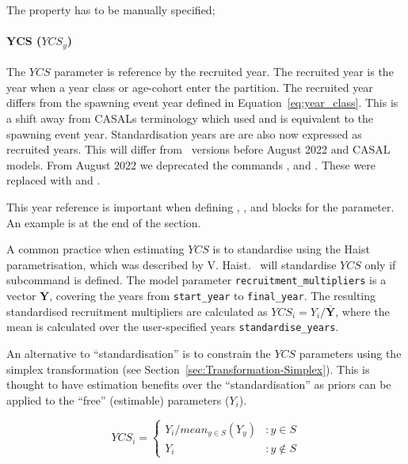 The property  has to be manually specified;

\paragraph*{YCS ($YCS_y$)}

The $YCS$ parameter is reference by the recruited year. The recruited year is the year when a year class or age-cohort enter the partition. The recruited year differs from the spawning event year defined in Equation~\eqref{eq:year_class}. This is a shift away from CASALs terminology which used  and is equivalent to the spawning event year. Standardisation years are are also now expressed as recruited years. This will differ from \CNAME\ versions before August 2022 and CASAL models. From August 2022 we deprecated the commands , and . These were replaced with  and .



This year reference is important when defining , , and  blocks for the  parameter. An example is at the end of the section.

A common practice when estimating $YCS$ is to standardise using the Haist parametrisation, which was described by V. Haist. \CNAME\ will standardise $YCS$ only if subcommand  is defined. The model parameter \texttt{recruitment\_multipliers} is a vector \textbf{Y}, covering the years from \texttt{start\_year} to \texttt{final\_year}. The resulting standardised recruitment multipliers are calculated as $YCS_i=Y_i/\bar{\textbf{Y}}$, where the mean is calculated over the user-specified years \texttt{standardise\_years}.

An alternative to \enquote{standardisation} is to constrain the $YCS$ parameters using the simplex transformation (see Section~\ref{sec:Transformation-Simplex}). This is thought to have estimation benefits over the \enquote{standardisation} as priors can be applied to the \enquote{free} (estimable) parameters (\(Y_i\)).

\[
YCS_i =
\begin{cases}
Y_i / mean_{y \in S}(Y_y) & :y \in S\\
Y_i					 & :y \notin S
\end{cases}
\]

